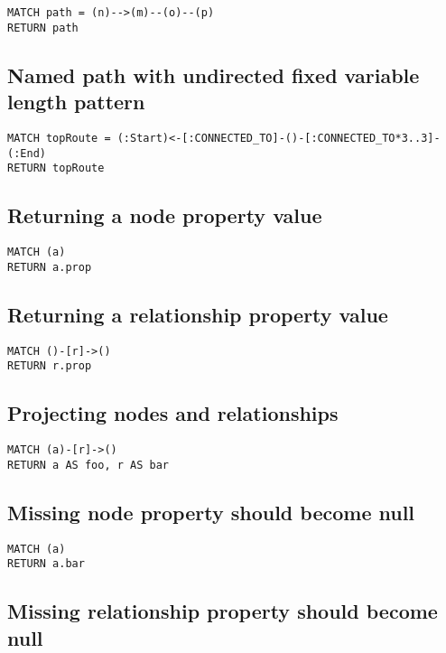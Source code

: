 \begin{lstlisting}
MATCH path = (n)-->(m)--(o)--(p)
RETURN path
\end{lstlisting}

\subsection{Named path with undirected fixed variable length pattern}

\begin{lstlisting}
MATCH topRoute = (:Start)<-[:CONNECTED_TO]-()-[:CONNECTED_TO*3..3]-(:End)
RETURN topRoute
\end{lstlisting}

\subsection{Returning a node property value}

\begin{lstlisting}
MATCH (a)
RETURN a.prop
\end{lstlisting}

\subsection{Returning a relationship property value}

\begin{lstlisting}
MATCH ()-[r]->()
RETURN r.prop
\end{lstlisting}

\subsection{Projecting nodes and relationships}

\begin{lstlisting}
MATCH (a)-[r]->()
RETURN a AS foo, r AS bar
\end{lstlisting}

\subsection{Missing node property should become null}

\begin{lstlisting}
MATCH (a)
RETURN a.bar
\end{lstlisting}

\subsection{Missing relationship property should become null}

